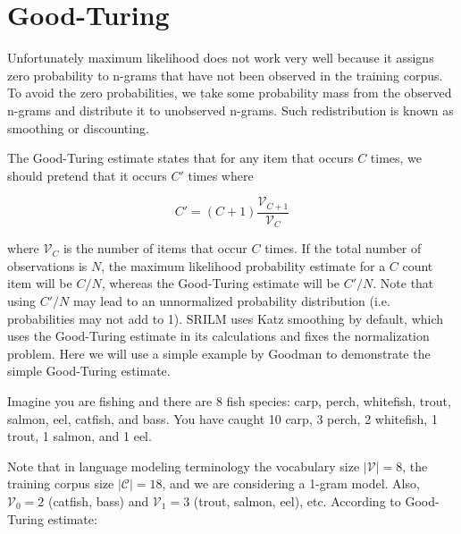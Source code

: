 \documentclass[a4paper]{article}
\newcommand{\vocab}{\mathcal{V}}
\begin{document}
\newpage
\section{Good-Turing}

Unfortunately maximum likelihood does not work very well because it
assigns zero probability to n-grams that have not been observed in the
training corpus.  To avoid the zero probabilities, we take some
probability mass from the observed n-grams and distribute it to
unobserved n-grams.  Such redistribution is known as smoothing or
discounting.

The Good-Turing estimate states that for any item that occurs $C$
times, we should pretend that it occurs $C'$ times where

\[ C' = (C + 1) \frac{\vocab_{C+1}}{\vocab_{C}} \]

where $\vocab_C$ is the number of items that occur $C$ times.  If the
total number of observations is $N$, the maximum likelihood
probability estimate for a $C$ count item will be $C/N$, whereas the
Good-Turing estimate will be $C'/N$.  Note that using $C'/N$ may lead
to an unnormalized probability distribution (i.e. probabilities may
not add to 1).  SRILM uses Katz smoothing by default, which uses the
Good-Turing estimate in its calculations and fixes the normalization
problem.  Here we will use a simple example by Goodman to demonstrate
the simple Good-Turing estimate.

Imagine you are fishing and there are 8 fish species: carp, perch,
whitefish, trout, salmon, eel, catfish, and bass.  You have caught 10
carp, 3 perch, 2 whitefish, 1 trout, 1 salmon, and 1 eel.  

Note that in language modeling terminology the vocabulary size
$|\vocab|=8$, the training corpus size $|\mathcal{C}|=18$, and we are
considering a 1-gram model.  Also, $\vocab_0 = 2$ (catfish, bass) and
$\vocab_1 = 3$ (trout, salmon, eel), etc.  According to Good-Turing
estimate:
\end{document}
